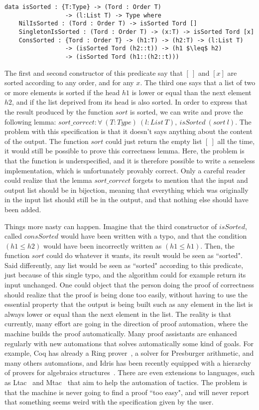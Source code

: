 \begin{lstlisting}
data isSorted : {T:Type} -> (Tord : Order T) 
                 -> (l:List T) -> Type where
    NilIsSorted : (Tord : Order T) -> isSorted Tord []
    SingletonIsSorted : (Tord : Order T) -> (x:T) -> isSorted Tord [x]
    ConsSorted : {Tord : Order T} -> (h1:T) -> (h2:T) -> (l:List T) 
                 -> (isSorted Tord (h2::t)) -> (h1 $\leq$ h2) 
                 -> (isSorted Tord (h1::(h2::t)))
\end{lstlisting}
The first and second constructor of this predicate say that $[\ ]$ and $[x]$ are sorted according to any order, and for any $x$. The third one says that a list of two or more elements is sorted if the head $h1$ is lower or equal than the next element $h2$, and if the list deprived from its head is also sorted. In order to express that the result produced by the function $sort$ is sorted, we can write and prove the following lemma:
$sort\_correct : \forall\ (T:Type)\ (l:List\ T),\ isSorted\ (sort\ l)$. The problem with this specification is that it doesn't says anything about the content of the output. The function $sort$ could just return the empty list $[\ ]$ all the time, it would still be possible to prove this correctness lemma. Here, the problem is that the function is underspecified, and it is therefore possible to write a senseless implementation, which is unfortunately provably correct. Only a careful reader could realize that the lemma $sort\_correct$ forgets to mention that the input and output list should be in bijection, meaning that everything which was originally in the input list should still be in the output, and that nothing else should have been added.

Things more nasty can happen. Imagine that the third constructor of $isSorted$, called $consSorted$ would have been written with a typo, and that the condition $(h1 \leq h2) $ would have been incorrectly written as $(h1 \leq h1)$. Then, the function $sort$ could do whatever it wants, its result would be seen as ``sorted". Said differently, any list would be seen as ``sorted" according to this predicate, just because of this single typo, and the algorithm could for example return its input unchanged. One could object that the person doing the proof of correctness should realize that the proof is being done too easily, without having to use the essential property that the output is being built such as any element in the list is always lower or equal than the next element in the list. The reality is that currently, many effort are going in the direction of proof automation, where the machine builds the proof automatically. Many proof assistants are enhanced regularly with new automations that solves automatically some kind of goals. For example, Coq has already a Ring prover~\cite{coq2005}, a solver for Presburger arithmetic, and many others automations, and Idris has been recently equipped with a hierarchy of provers for algebraics structures~\cite{Slama2016}. There are even extensions to languages, such as Ltac~\cite{DelahayeLTac} and Mtac~\cite{Ziliani13} that aim to help the automation of tactics. The problem is that the machine is never going to find a proof ``too easy", and will never report that something seems weird with the specification given by the user.

